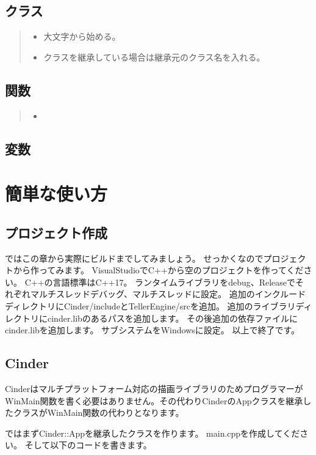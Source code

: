 \documentclass[12pt,a4paper,uplatex,dvipdfmx]{jsarticle}
\begin{document}
\subsection*{クラス}
\begin{quote}
  \begin{itemize}
    \item 大文字から始める。
    \item クラスを継承している場合は継承元のクラス名を入れる。
  \end{itemize}
\end{quote}
\subsection*{関数}
\begin{quote}
  \begin{itemize}
    \item 
  \end{itemize}
\end{quote}
\subsection*{変数}

\section{簡単な使い方}
\subsection{プロジェクト作成}
ではこの章から実際にビルドまでしてみましょう。
せっかくなのでプロジェクトから作ってみます。
VisualStudioでC++から空のプロジェクトを作ってください。
C++の言語標準はC++17。
ランタイムライブラリをdebug、Releaseでそれぞれマルチスレッドデバッグ、マルチスレッドに設定。
追加のインクルードディレクトリにCinder/includeとTellerEngine/srcを追加。
追加のライブラリディレクトリにcinder.libのあるパスを追加します。
その後追加の依存ファイルにcinder.libを追加します。
サブシステムをWindowsに設定。
以上で終了です。

\subsection{Cinder}
Cinderはマルチプラットフォーム対応の描画ライブラリのためプログラマーがWinMain関数を書く必要はありません。その代わりCinderのAppクラスを継承したクラスがWinMain関数の代わりとなります。

ではまずCinder::Appを継承したクラスを作ります。
main.cppを作成してください。
そして以下のコードを書きます。
\end{document}
